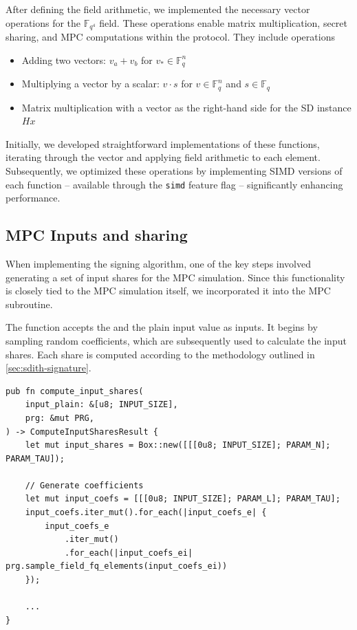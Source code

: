 \documentclass[11pt]{report}
\theoremstyle{definition}
\theoremstyle{plain}
\begin{document}
After defining the field arithmetic, we implemented the necessary vector operations for the $\mathbb{F}_{q^4}$ field. These operations enable matrix multiplication, secret sharing, and MPC computations within the protocol. They include operations

\begin{itemize}
  \item Adding two vectors: $v_a + v_b$ for $v_* \in \mathbb{F}_{q}^n$
  \item Multiplying a vector by a scalar: $v \cdot s$ for $v \in \mathbb{F}_{q}^n$ and $s \in \mathbb{F}_{q}$
  \item Matrix multiplication with a vector as the right-hand side for the SD instance $Hx$
\end{itemize}

Initially, we developed straightforward implementations of these functions, iterating through the vector and applying field arithmetic to each element. Subsequently, we optimized these operations by implementing SIMD versions of each function -- available through the \texttt{simd} feature flag -- significantly enhancing performance.

\subsection{MPC Inputs and sharing}
When implementing the signing algorithm, one of the key steps involved generating a set of input shares for the MPC simulation. Since this functionality is closely tied to the MPC simulation itself, we incorporated it into the MPC subroutine.

The function accepts the  and the plain input value as inputs. It begins by sampling random coefficients, which are subsequently used to calculate the input shares. Each share is computed according to the methodology outlined in \autoref{sec:sdith-signature}.

\begin{verbatim}
pub fn compute_input_shares(
    input_plain: &[u8; INPUT_SIZE],
    prg: &mut PRG,
) -> ComputeInputSharesResult {
    let mut input_shares = Box::new([[[0u8; INPUT_SIZE]; PARAM_N]; PARAM_TAU]);

    // Generate coefficients
    let mut input_coefs = [[[0u8; INPUT_SIZE]; PARAM_L]; PARAM_TAU];
    input_coefs.iter_mut().for_each(|input_coefs_e| {
        input_coefs_e
            .iter_mut()
            .for_each(|input_coefs_ei| prg.sample_field_fq_elements(input_coefs_ei))
    });

    ...
}
\end{verbatim}
\end{document}
